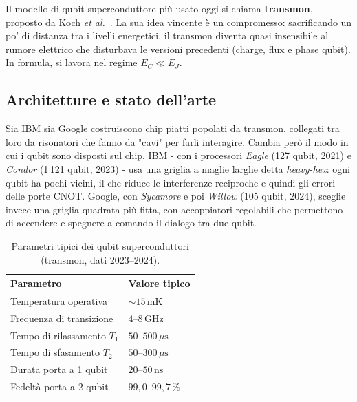 Il modello di qubit superconduttore più usato oggi si chiama \textbf{transmon},
proposto da Koch \textit{et al.}~\cite{koch2007charge}. La sua idea vincente è
un compromesso: sacrificando un po' di distanza tra i livelli energetici, il
transmon diventa quasi insensibile al rumore elettrico che disturbava le
versioni precedenti (charge, flux e phase qubit). In formula, si lavora nel
regime $E_C \ll E_J$.

\subsection{Architetture e stato dell'arte}
\label{subsec:sc-stato}

Sia IBM sia Google costruiscono chip piatti popolati da transmon, collegati tra
loro da risonatori che fanno da "cavi" per farli interagire. Cambia però il
modo in cui i qubit sono disposti sul chip. IBM - con i processori
\textit{Eagle} (127 qubit, 2021) e \textit{Condor} (1\,121 qubit, 2023) - usa
una griglia a maglie larghe detta \textit{heavy-hex}: ogni qubit ha pochi
vicini, il che riduce le interferenze reciproche e quindi gli errori delle
porte CNOT. Google, con \textit{Sycamore} e poi \textit{Willow} (105 qubit,
2024), sceglie invece una griglia quadrata più fitta, con accoppiatori
regolabili che permettono di accendere e spegnere a comando il dialogo tra due
qubit.

\begin{table}[ht]
  \centering
  \renewcommand{\arraystretch}{1.3}
  \caption{Parametri tipici dei qubit superconduttori (transmon, dati 2023--2024).}
  \label{tab:transmon}
  \begin{tabularx}{\textwidth}{lX}
    \toprule
    Parametro & Valore tipico \\
    \midrule
    Temperatura operativa        & $\sim 15\,\text{mK}$ \\
    Frequenza di transizione     & $4$--$8\,\text{GHz}$ \\
    Tempo di rilassamento $T_1$  & $50$--$500\,\mu\text{s}$ \\
    Tempo di sfasamento $T_2$    & $50$--$300\,\mu\text{s}$ \\
    Durata porta a 1 qubit       & $20$--$50\,\text{ns}$ \\
    Fedeltà porta a 2 qubit      & $99{,}0$--$99{,}7\,\%$ \\
    \bottomrule
  \end{tabularx}
\end{table}

